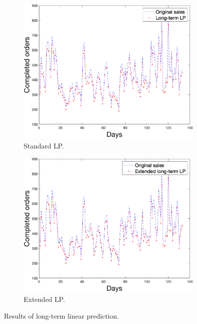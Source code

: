     \begin{figure}[h!]
        \centering
        \begin{subfigure}[b]{0.4\textwidth}
            \includegraphics[width=1\textwidth]{figures/expLTLP.png}
            \caption{Standard LP.}
            \label{fig:ltlp}
        \end{subfigure}
        \hspace{0.1\textwidth}
        \begin{subfigure}[b]{0.4\textwidth}
            \includegraphics[width=1\textwidth]{figures/expELTLP.png}
            \caption{Extended LP.}
            \label{fig:ltlpmse}
        \end{subfigure}
        \caption{Results of long-term linear prediction.}
        \label{fig:shortresult}
    \end{figure}
    
